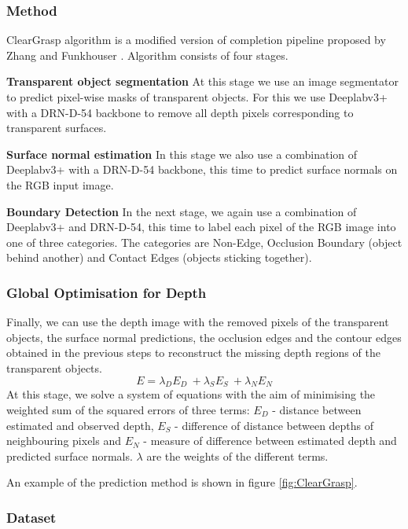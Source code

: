 \documentclass[10pt,twocolumn,letterpaper]{article}
\begin{document}
\subsubsection{Method}

ClearGrasp algorithm \cite{Sajjan_Moore_Pan_Nagaraja_Lee_Zeng_Song_2019} is a modified version of completion pipeline proposed by Zhang and Funkhouser \cite{47764}. Algorithm consists of four stages.

\textbf{Transparent object segmentation}
At this stage we use an image segmentator to predict pixel-wise masks of transparent objects. For this we use Deeplabv3+ \cite{7913730} \cite{Chen_Zhu_Papandreou_Schroff_Adam_2018} with a DRN-D-54 \cite{Zhang_Funkhouser_2018} backbone to remove all depth pixels corresponding to transparent surfaces.

\textbf{Surface normal estimation}
In this stage we also use a combination of Deeplabv3+ with a DRN-D-54 backbone, this time to predict surface normals on the RGB input image.

\textbf{Boundary Detection}
In the next stage, we again use a combination of Deeplabv3+ and DRN-D-54, this time to label each pixel of the RGB image into one of three categories. The categories are Non-Edge, Occlusion Boundary (object behind another) and Contact Edges (objects sticking together).

\subsubsection{Global Optimisation for Depth}
Finally, we can use the depth image with the removed pixels of the transparent objects, the surface normal predictions, the occlusion edges and the contour edges obtained in the previous steps to reconstruct the missing depth regions of the transparent objects.
\[E = \lambda_D E_D\ + \lambda_S E_S\ + \lambda_N E_N\]
At this stage, we solve a system of equations with the aim of minimising the weighted sum of the squared errors of three terms: \(E_D\) - distance between estimated and observed depth, \(E_S\) - difference of distance between depths of neighbouring pixels and \(E_N\) - measure of difference between estimated depth and predicted surface normals. \(\lambda\) are the weights of the different terms.

An example of the prediction method is shown in figure \ref{fig:ClearGrasp}.

\subsubsection{Dataset}
\end{document}
